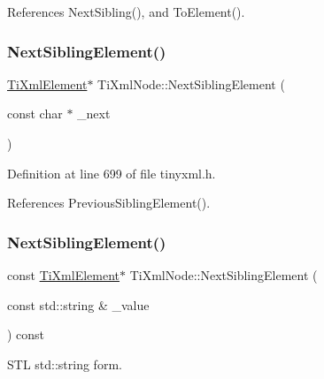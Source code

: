 References Next\+Sibling(), and To\+Element().

\hypertarget{class_ti_xml_node_a6e1ac6b800e18049bc75e9f8e63a8e5f}{}\label{class_ti_xml_node_a6e1ac6b800e18049bc75e9f8e63a8e5f} 
\subsubsection{\texorpdfstring{Next\+Sibling\+Element()}{NextSiblingElement()}\hspace{0.1cm}{\footnotesize\ttfamily [4/6]}}
{\footnotesize\ttfamily \hyperlink{class_ti_xml_element}{Ti\+Xml\+Element}$\ast$ Ti\+Xml\+Node\+::\+Next\+Sibling\+Element (\begin{DoxyParamCaption}\item[{const char $\ast$}]{\+\_\+next }\end{DoxyParamCaption})\hspace{0.3cm}{\ttfamily [inline]}}



Definition at line 699 of file tinyxml.\+h.



References Previous\+Sibling\+Element().

\hypertarget{class_ti_xml_node_a2dd7a81689a717fe5d15b3520879ff00}{}\label{class_ti_xml_node_a2dd7a81689a717fe5d15b3520879ff00} 
\subsubsection{\texorpdfstring{Next\+Sibling\+Element()}{NextSiblingElement()}\hspace{0.1cm}{\footnotesize\ttfamily [5/6]}}
{\footnotesize\ttfamily const \hyperlink{class_ti_xml_element}{Ti\+Xml\+Element}$\ast$ Ti\+Xml\+Node\+::\+Next\+Sibling\+Element (\begin{DoxyParamCaption}\item[{const std\+::string \&}]{\+\_\+value }\end{DoxyParamCaption}) const\hspace{0.3cm}{\ttfamily [inline]}}



S\+TL std\+::string form. 



